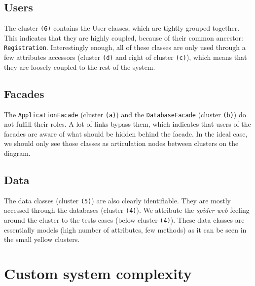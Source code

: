 \subsection{Users}
The cluster \texttt{(6)} contains the User classes, which are tightly grouped together. This indicates that they are highly coupled, because of their common ancestor: \texttt{Registration}. Interestingly enough, all of these classes are only used through a few attributes accessors (cluster \texttt{(d)} and right of cluster \texttt{(c)}), which means that they are loosely coupled to the rest of the system.

\subsection{Facades}
The \texttt{ApplicationFacade} (cluster \texttt{(a)}) and the \texttt{DatabaseFacade} (cluster \texttt{(b)}) do not fulfill their roles. A lot of links bypass them, which indicates that users of the facades are aware of what should be hidden behind the facade. In the ideal case, we should only see those classes as articulation nodes between clusters on the diagram.

\subsection{Data}
The data classes (cluster \texttt{(5)}) are also clearly identifiable. They are mostly accessed through the databases (cluster \texttt{(4)}). We attribute the \textit{spider web} feeling around the cluster to the tests cases (below cluster \texttt{(4)}). These data classes are essentially models (high number of attributes, few methods) as it can be seen in the small yellow clusters.

\section{Custom system complexity}
